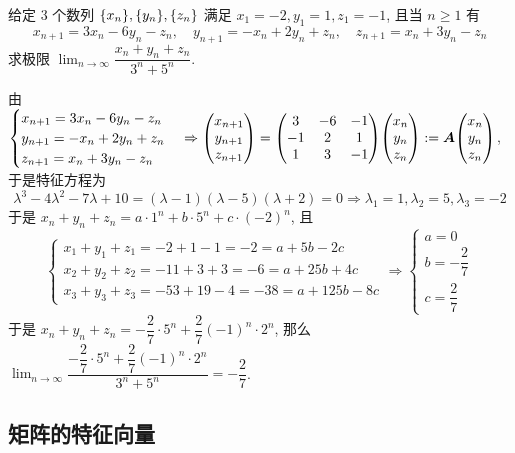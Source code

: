 \begin{example}
    给定 3 个数列 $\qty{x_n},\qty{y_n},\qty{z_n}$ 满足 $x_1=-2,y_1=1,z_1=-1$, 且当 $n\geqslant 1$ 有
    $$x_{n+1}=3x_n-6y_n-z_n,\quad y_{n+1}=-x_n+2y_n+z_n,\quad z_{n+1}=x_n+3y_n-z_n$$
    求极限 $\displaystyle\lim_{n\to\infty}\dfrac{x_n+y_n+z_n}{3^n+5^n}.$
\end{example}
\begin{solution}
    由 $\begin{cases}
            x_{n+1}=3x_n-6y_n-z_n \\
            y_{n+1}=-x_n+2y_n+z_n \\
            z_{n+1}=x_n+3y_n-z_n
        \end{cases}\Rightarrow \mqty(x_{n+1}\\y_{n+1}\\z_{n+1})=\mqty(3&-6&-1\\-1&2&1\\1&3&-1)\mqty(x_{n}\\y_n\\z_n):=\vb*{A}\mqty(x_{n}\\y_n\\z_n)$, 于是特征方程为
    $$\lambda^3-4\lambda^2-7\lambda+10=(\lambda-1)(\lambda-5)(\lambda+2)=0\Rightarrow \lambda_1=1,\lambda_2=5,\lambda_3=-2$$
    于是 $x_n+y_n+z_n=a\cdot 1^n+b\cdot 5^n+c\cdot (-2)^n$, 且
    $$\begin{cases}
            x_1+y_1+z_1=-2+1-1=-2=a+5b-2c   \\
            x_2+y_2+z_2=-11+3+3=-6=a+25b+4c \\
            x_3+y_3+z_3=-53+19-4=-38=a+125b-8c
        \end{cases}\Rightarrow \begin{cases}
            a=0             \\
            b=-\dfrac{2}{7} \\[6pt]
            c=\dfrac{2}{7}
        \end{cases}$$
    于是 $x_n+y_n+z_n=-\dfrac{2}{7}\cdot 5^n+\dfrac{2}{7}(-1)^n\cdot 2^n$, 那么 $\displaystyle\lim_{n\to\infty}\dfrac{-\dfrac{2}{7}\cdot 5^n+\dfrac{2}{7}(-1)^n\cdot 2^n}{3^n+5^n}=-\dfrac{2}{7}$.
\end{solution}

\subsection{矩阵的特征向量}


